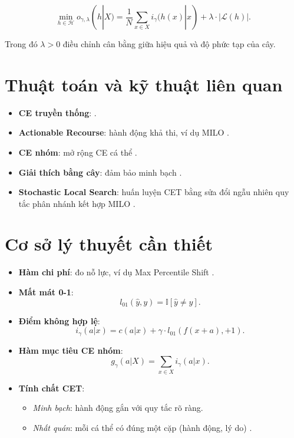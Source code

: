 \begin{problem}
\[
\min_{h \in \mathcal{H}} o_{\gamma,\lambda}(h|X) =
\frac{1}{N}\sum_{x \in X} i_\gamma(h(x)|x) + \lambda \cdot |\mathcal{L}(h)|.
\]
\end{problem}

Trong đó $\lambda > 0$ điều chỉnh cân bằng giữa hiệu quả và độ phức tạp của cây.

\section{Thuật toán và kỹ thuật liên quan}

\begin{itemize}
    \item \textbf{CE truyền thống}: \textcite{wachter2018counterfactualexplanationsopeningblack}.
    \item \textbf{Actionable Recourse}: hành động khả thi, ví dụ MILO \parencite{Ustun_2019}.
    \item \textbf{CE nhóm}: mở rộng CE cá thể \parencite{karimi2021surveyalgorithmicrecoursedefinitions}.
    \item \textbf{Giải thích bằng cây}: đảm bảo minh bạch \parencite{freitas,guidotti2018surveymethodsexplainingblack}.
    \item \textbf{Stochastic Local Search}: huấn luyện CET bằng sửa đổi ngẫu nhiên quy tắc phân nhánh kết hợp MILO \parencite{Kanamori:AISTATS2022}.
\end{itemize}

\section{Cơ sở lý thuyết cần thiết}

\begin{itemize}
    \item \textbf{Hàm chi phí}: đo nỗ lực, ví dụ Max Percentile Shift \parencite{Ustun_2019}.
    \item \textbf{Mất mát 0-1}:
    \[
    l_{01}(\hat{y},y) = \mathbb{I}[\hat{y} \neq y].
    \]
    \item \textbf{Điểm không hợp lệ}:
    \[
    i_\gamma(a|x) = c(a|x) + \gamma \cdot l_{01}(f(x+a),+1).
    \]
    \item \textbf{Hàm mục tiêu CE nhóm}:
    \[
    g_\gamma(a|X) = \sum_{x \in X} i_\gamma(a|x).
    \]
    \item \textbf{Tính chất CET}:
    \begin{itemize}
        \item \textit{Minh bạch}: hành động gắn với quy tắc rõ ràng.
        \item \textit{Nhất quán}: mỗi cá thể có đúng một cặp (hành động, lý do) \parencite{Kanamori:AISTATS2022}.
    \end{itemize}
\end{itemize}
